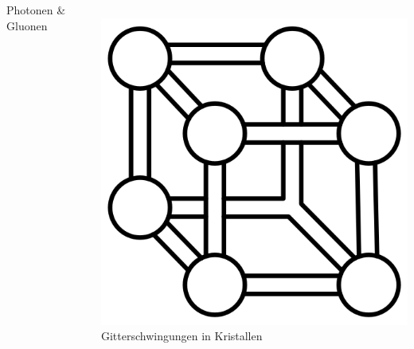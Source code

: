 \begin{frame}
\begin{columns}
\begin{column}{0.33\linewidth}
			Photonen \& Gluonen
		\end{column}
		\begin{column}{0.33\linewidth}
			\vspace*{0.75em}\\
			\centering
			\includegraphics[scale=1.2]{figures/Kommunikation/molekul.png}\\
			Gitterschwingungen in Kristallen
		\end{column}
	\end{columns}
\end{frame}